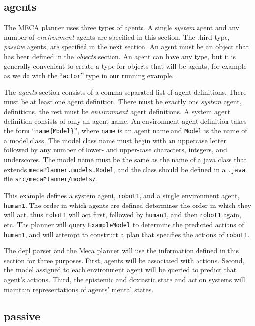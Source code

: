 \documentclass{article}
\begin{document}
\subsection{agents}

The MECA planner uses three types of agents. A single
\emph{system} agent and any number of \emph{environment} agents are specified in
this section.  The third type, \emph{passive} agents, are specified in the next
section. 
An agent must be an object that has been defined in the
\emph{objects} section. An agent can have any type, but it is generally
convenient to create a type for objects that will be agents, for example 
as we do with the ``\texttt{actor}'' type in our running example.

The \emph{agents} section consists of a comma-separated list of agent
definitions. There must be at least one agent definition. There must be exactly
one \emph{system} agent, definitions, the rest must be \emph{environment} agent
definitions. A system agent definition consists of only an agent name.
An environment
agent definition takes the form ``\texttt{name\{Model\}}'', where \texttt{name}
is an agent name and \texttt{Model} is the name of a model class. The model
class name must begin with an uppercase letter, followed by any number of
lower- and upper-case characters, integers, and underscores. The model name must
be the same as the name of a java class that extends
\texttt{mecaPlanner.models.Model}, and the class should be defined in a
\texttt{.java} file \texttt{src/mecaPlanner/models/}.

This example defines a system agent, \texttt{robot1}, and a single environment
agent, \texttt{human1}.
The order in which agents are defined determines the order in which they will
act. thus \texttt{robot1} will act first, followed by
\texttt{human1}, and then \texttt{robot1} again, etc. The planner will query
\texttt{ExampleModel} to determine the predicted actions of \texttt{human1}, and
will attempt to construct a plan that specifies the actions of \texttt{robot1}.

The depl parser and the Meca planner will use the information defined in this
section for three
purposes. First, agents will be associated with actions. Second, the model
assigned to each environment agent will be queried to predict that agent's
actions. Third, the epistemic and doxiastic state and action
systems will maintain representations of agents' mental states.



\subsection{passive}
\end{document}
